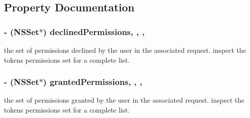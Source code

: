 \subsection{Property Documentation}
\hypertarget{interface_f_b_s_d_k_login_manager_login_result_ae64209439a8f3d962ce548d9581af510}{}
\subsubsection[{declined\+Permissions}]{\setlength{\rightskip}{0pt plus 5cm}-\/ (N\+S\+Set$\ast$) declined\+Permissions\hspace{0.3cm}{\ttfamily [read]}, {\ttfamily [write]}, {\ttfamily [nonatomic]}, {\ttfamily [copy]}}\label{interface_f_b_s_d_k_login_manager_login_result_ae64209439a8f3d962ce548d9581af510}
the set of permissions declined by the user in the associated request.  inspect the token\textquotesingle{}s permissions set for a complete list. \hypertarget{interface_f_b_s_d_k_login_manager_login_result_ae9fe0eaba0b1fddcf8c681c0a1f85e53}{}
\subsubsection[{granted\+Permissions}]{\setlength{\rightskip}{0pt plus 5cm}-\/ (N\+S\+Set$\ast$) granted\+Permissions\hspace{0.3cm}{\ttfamily [read]}, {\ttfamily [write]}, {\ttfamily [nonatomic]}, {\ttfamily [copy]}}\label{interface_f_b_s_d_k_login_manager_login_result_ae9fe0eaba0b1fddcf8c681c0a1f85e53}
the set of permissions granted by the user in the associated request.  inspect the token\textquotesingle{}s permissions set for a complete list. \hypertarget{interface_f_b_s_d_k_login_manager_login_result_a95ae85cb68f693c343232670c3d1ae64}{}
